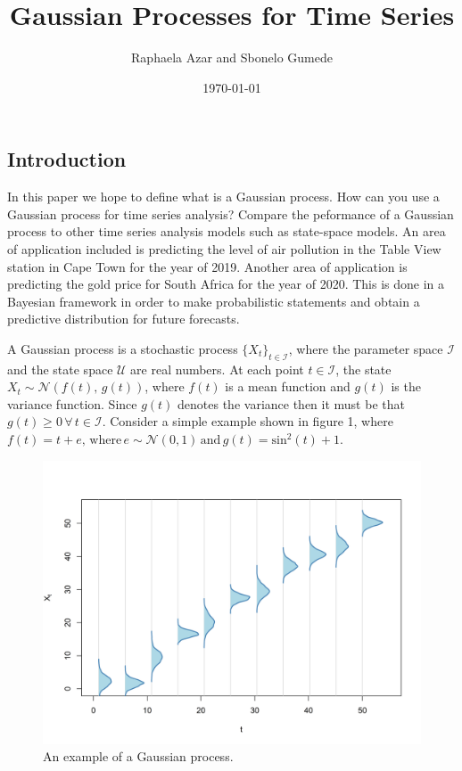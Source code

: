 \documentclass[a4paper, 10pt]{article}
\title{Gaussian Processes for Time Series}
\date{\today}
\author{Raphaela Azar and Sbonelo Gumede}
\begin{document}
   \maketitle

   \begin{flushleft}
   
   \section*{Introduction}

   In this paper we hope to define what is a Gaussian process. How can you use a Gaussian process for time series analysis? Compare the peformance of a Gaussian process to other time series analysis models such as state-space models. An area of application included is predicting the level of air pollution in the Table View station in Cape Town for the year of 2019. Another area of application is predicting the gold price for South Africa for the year of 2020. This is done in a Bayesian framework in order to make probabilistic statements and obtain a predictive distribution for future forecasts.

   \vspace{1em}

   A Gaussian process is a stochastic process $\{X_{t} \}_{t \in \mathcal{I}}$, where the parameter space $\mathcal{I}$ and the state space $\mathcal{U}$ are real numbers. At each point $t \in \mathcal{I}$, the state $X_{t} \sim \mathcal{N}(f(t), \, g(t))$, where $f(t)$ is a mean function and $g(t)$ is the variance function. Since $g(t)$ denotes the variance then it must be that $g(t) \geq 0 \, \forall \, t \in \mathcal{I}$. Consider a simple example shown in figure 1, where $f(t) = t + e, \, \text{where} \, e \sim \mathcal{N}(0, 1) \, \text{and} \, g(t) = \text{sin}^{2}(t) + 1$.
   
   \begin{figure}[H]
            \raggedright
            \includegraphics[width=0.48\linewidth]{../images/gp.png}
            \caption{An example of a Gaussian process.}
   \end{figure}
   

\end{flushleft}
\end{document}
